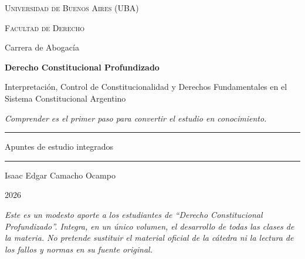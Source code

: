 \documentclass[12pt,oneside]{book}
\newcommand{\universidad}{Universidad de Buenos Aires (UBA)}
\newcommand{\facultad}{Facultad de Derecho}
\newcommand{\carrera}{Carrera de Abogacía}
\newcommand{\materia}{Derecho Constitucional Profundizado}
\newcommand{\titulo}{Interpretación, Control de Constitucionalidad y Derechos Fundamentales en el Sistema Constitucional Argentino}
\newcommand{\autor}{Isaac Edgar Camacho Ocampo}
\newcommand{\anio}{2026}
\begin{document}
\frontmatter

\begin{titlepage}
\thispagestyle{empty}
\begin{center}

\vspace*{1cm}
{\large \textsc{\universidad}}
\vspace{0.2cm}

{\large \textsc{\facultad}}
\vspace{0.2cm}

{\large \carrera}
\vspace{3cm}

{\Huge \textbf{\materia}}
\vspace{1cm}

{\LARGE \titulo}
\vspace{0.8cm}

\textit{Comprender es el primer paso para convertir el estudio en conocimiento.}
\vspace{1.2cm}

\rule{0.70\textwidth}{0.5pt}
\vspace{0.5cm}

{\large Apuntes de estudio integrados}
\vspace{0.5cm}

\rule{0.70\textwidth}{0.5pt}
\vfill

{\large \autor}
\vspace{0.3cm}

{\large \anio}

\end{center}
\vfill

\begin{flushleft}
\textit{Este es un modesto aporte a los estudiantes de ``Derecho Constitucional Profundizado''. Integra, en un único volumen, el desarrollo de todas las clases de la materia. No pretende sustituir el material oficial de la cátedra ni la lectura de los fallos y normas en su fuente original.}
\end{flushleft}
\end{titlepage}

\tableofcontents

\end{document}
